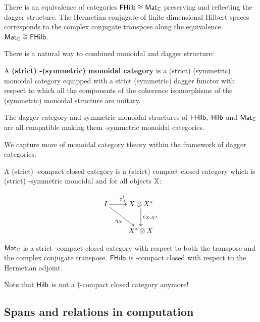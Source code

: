 \begin{lemma}
There is an equivalence of categories $\mathsf{FHilb} \cong \mathsf{Mat}_{\mathbb{C}}$ preserving and reflecting the dagger structure.
The Hermetian conjugate of finite dimensional Hilbert spaces corresponds to the complex conjugate transpose along the equivalence $\mathsf{Mat}_{\mathbb{C}} \cong \mathsf{FHilb}$.
\end{lemma}



There is a natural way to combined monoidal and dagger structure:

\begin{definition}
A {\bf  (strict) \dag-(symmetric) monoidal category} is a (strict) (symmetric) monoidal category equipped with a strict (symmetric) dagger functor with respect to which all the components of the  coherence isomorphisms of the (symmetric) monoidal structure are unitary.
\end{definition}



\begin{example}
The dagger category and symmetric monoidal structures of $\mathsf{FHilb}$, $\mathsf{Hilb}$ and $\mathsf{Mat}_{\mathbb{C}}$ are all compatible making them \dag-symmetric monoidal categories.
\end{example}


We capture more of monoidal category theory within the framework of dagger categories:

\begin{definition}
A {(strict) \dag-compact closed category} is a (strict) compact closed category which is (strict) \dag-symmetric monoidal and for all objects $\mathbb{X}$:

$$
\xymatrix{
I \ar[r]^{\epsilon_X^\dag} \ar[dr]_{\eta_X}   &  X\otimes X^* \ar[d]^{c_{X,X^*}}\\
                                                                        &  X^* \otimes X 
}
$$
\end{definition}

\begin{example}
$\mathsf{Mat}_{\mathbb{C}}$ is a strict \dag-compact closed category with respect to both the transpose and the complex conjugate transpose.  
$\mathsf{FHilb}$ is \dag-compact closed with respect to the  Hermetian adjoint.

\end{example}

Note that $\mathsf{Hilb}$ is not a $\dag$-compact closed category anymore!




\subsection{Spans and relations in computation}

